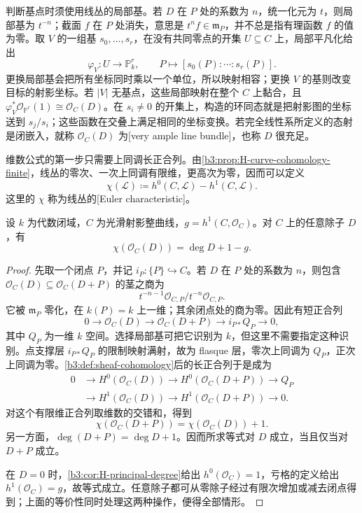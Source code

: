 \ProseParagraphBreak
判断基点时须使用线丛的局部基。若 \(D\) 在 \(P\) 处的系数为 \(n\)，统一化元为 \(t\)，则局部基为 \(t^{-n}\)；截面 \(f\) 在 \(P\) 处消失，意思是 \(t^nf\in\mathfrak m_P\)，并不总是指有理函数 \(f\) 的值为零。取 \(V\) 的一组基 \(s_0,\ldots,s_r\)，在没有共同零点的开集 \(U\subseteq C\) 上，局部平凡化给出
\[
	\varphi_V:U\longrightarrow\mathbb P_k^r,\qquad
	P\longmapsto[s_0(P):\cdots:s_r(P)].
\]
更换局部基会把所有坐标同时乘以一个单位，所以映射相容；更换 \(V\) 的基则改变目标的射影坐标。若 \(|V|\) 无基点，这些局部映射在整个 \(C\) 上黏合，且 \(\varphi_V^*\mathcal O_{\mathbb P^r}(1)\cong\mathcal O_C(D)\)。在 \(s_i\ne0\) 的开集上，构造的环同态就是把射影图的坐标送到 \(s_j/s_i\)；这些函数在交叠上满足相同的坐标变换。若完全线性系所定义的态射是闭嵌入，就称 \(\mathcal O_C(D)\) 为[very ample line bundle]，也称 \(D\) 很充足。

\ProseParagraphBreak
维数公式的第一步只需要上同调长正合列。由\cref{b3:prop:H-curve-cohomology-finite}，线丛的零次、一次上同调有限维，更高次为零，因而可以定义
\[
	\chi(\mathcal L)\coloneqq h^0(C,\mathcal L)-h^1(C,\mathcal L).
\]
这里的 \(\chi\) 称为线丛的[Euler characteristic]。

\begin{proposition}\label{b3:prop:H-euler-characteristic-divisor}
	设 \(k\) 为代数闭域，\(C\) 为光滑射影整曲线，\(g=h^1(C,\mathcal O_C)\)。对 \(C\) 上的任意除子 \(D\)，有
	\[
		\chi(\mathcal O_C(D))=\deg D+1-g.
	\]
\end{proposition}
\begin{proof}
	先取一个闭点 \(P\)，并记 \(i_P:\{P\}\hookrightarrow C\)。若 \(D\) 在 \(P\) 处的系数为 \(n\)，则包含 \(\mathcal O_C(D)\subseteq\mathcal O_C(D+P)\) 的茎之商为
	\[
		t^{-n-1}\mathcal O_{C,P}/t^{-n}\mathcal O_{C,P}.
	\]
	它被 \(\mathfrak m_P\) 零化，在 \(k(P)=k\) 上一维；其余闭点处的商为零。因此有短正合列
	\[
		0\longrightarrow\mathcal O_C(D)\longrightarrow\mathcal O_C(D+P)
		\longrightarrow i_{P*}Q_P\longrightarrow0,
	\]
	其中 \(Q_P\) 为一维 \(k\) 空间。选择局部基可把它识别为 \(k\)，但这里不需要指定这种识别。点支撑层 \(i_{P*}Q_P\) 的限制映射满射，故为 flasque 层，零次上同调为 \(Q_P\)，正次上同调为零。\cref{b3:def:sheaf-cohomology}后的长正合列于是成为
	\[
		\begin{aligned}
			0&\longrightarrow H^0(\mathcal O_C(D))\longrightarrow H^0(\mathcal O_C(D+P))
			\longrightarrow Q_P\\
			&\longrightarrow H^1(\mathcal O_C(D))\longrightarrow H^1(\mathcal O_C(D+P))
			\longrightarrow0.
		\end{aligned}
	\]
	对这个有限维正合列取维数的交错和，得到
	\[
		\chi(\mathcal O_C(D+P))=\chi(\mathcal O_C(D))+1.
	\]
	另一方面，\(\deg(D+P)=\deg D+1\)。因而所求等式对 \(D\) 成立，当且仅当对 \(D+P\) 成立。

	在 \(D=0\) 时，\cref{b3:cor:H-principal-degree}给出 \(h^0(\mathcal O_C)=1\)，亏格的定义给出 \(h^1(\mathcal O_C)=g\)，故等式成立。任意除子都可从零除子经过有限次增加或减去闭点得到；上面的等价性同时处理这两种操作，便得全部情形。
\end{proof}

